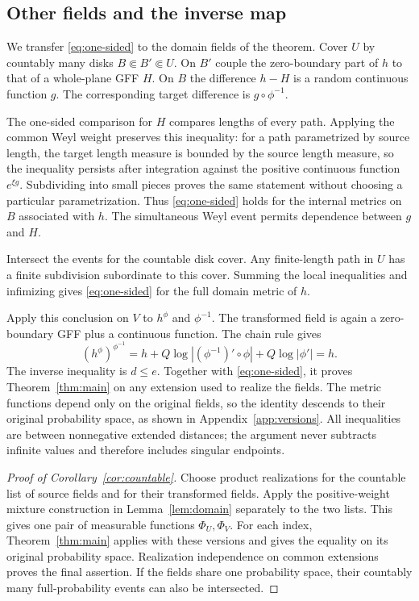 \documentclass[11pt]{article}
\theoremstyle{definition}
\theoremstyle{remark}
\begin{document}
\subsection{Other fields and the inverse map}
We transfer \eqref{eq:one-sided} to the domain fields of the
theorem. Cover $U$ by countably many disks
$B\Subset B'\Subset U$. On $B'$ couple the zero-boundary part
of $h$ to that of a whole-plane GFF $H$. On $B$ the difference
$h-H$ is a random continuous function $g$. The corresponding
target difference is $g\circ\phi^{-1}$.

The one-sided comparison for $H$ compares lengths of every
path. Applying the common Weyl weight preserves this
inequality: for a path parametrized by source length, the
target length measure is bounded by the source length measure,
so the inequality persists after integration against the
positive continuous function $e^{\xi g}$. Subdividing into
small pieces proves the same statement without choosing a
particular parametrization. Thus \eqref{eq:one-sided} holds
for the internal metrics on $B$ associated with $h$.
The simultaneous Weyl event permits dependence between $g$
and $H$.

Intersect the events for the countable disk cover. Any
finite-length path in $U$ has a finite subdivision subordinate
to this cover. Summing the local inequalities and infimizing
gives \eqref{eq:one-sided} for the full domain metric of $h$.

Apply this conclusion on $V$ to $h^\phi$ and $\phi^{-1}$.
The transformed field is again a zero-boundary GFF plus a
continuous function. The chain rule gives
\[
 (h^\phi)^{\phi^{-1}}
   =h+Q\log|(\phi^{-1})'\circ\phi|+Q\log|\phi'|=h.
\]
The inverse inequality is $d\le e$. Together with
\eqref{eq:one-sided}, it proves Theorem~\ref{thm:main} on
any extension used to realize the fields. The metric functions
depend only on the original fields, so the identity descends
to their original probability space, as shown in
Appendix~\ref{app:versions}. All inequalities are between
nonnegative extended distances; the argument never subtracts
infinite values and therefore includes singular endpoints.

\begin{proof}[Proof of Corollary~\ref{cor:countable}]
Choose product realizations for the countable list of source
fields and for their transformed fields. Apply the
positive-weight mixture construction in
Lemma~\ref{lem:domain} separately to the two lists. This gives
one pair of measurable functions $\Phi_U,\Phi_V$.
For each index, Theorem~\ref{thm:main} applies with these
versions and gives the equality on its original probability
space. Realization independence on common extensions proves
the final assertion. If the fields share one probability
space, their countably many full-probability events can also
be intersected.
\end{proof}
\end{document}
